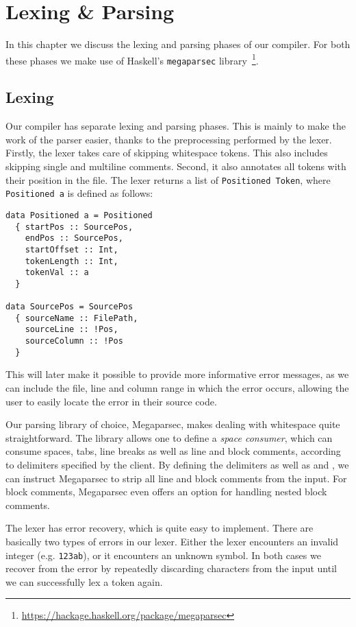 \chapter{Lexing \& Parsing}

In this chapter we discuss the lexing and parsing phases of our compiler.
For both these phases we make use of Haskell's \texttt{megaparsec}
library~\footnote{\url{https://hackage.haskell.org/package/megaparsec}}.

\section{Lexing}
Our compiler has separate lexing and parsing phases.
This is mainly to make the work of the parser easier, thanks to the preprocessing
performed by the lexer.
Firstly, the lexer takes care of skipping whitespace tokens.
This also includes skipping single and multiline comments.
Second, it also annotates all tokens with their position in the file.
The lexer returns a list of \texttt{Positioned Token},
where \texttt{Positioned a} is defined as follows:
\begin{verbatim}
data Positioned a = Positioned
  { startPos :: SourcePos,
    endPos :: SourcePos,
    startOffset :: Int,
    tokenLength :: Int,
    tokenVal :: a
  }

data SourcePos = SourcePos
  { sourceName :: FilePath,
    sourceLine :: !Pos,
    sourceColumn :: !Pos
  }
\end{verbatim}
This will later make it possible to provide more informative error messages, as
we can include the file, line and column range in which the error occurs,
allowing the user to easily locate the error in their source code.

Our parsing library of choice, Megaparsec, makes dealing with whitespace quite
straightforward. The library allows one to define a \emph{space consumer}, which
can consume spaces, tabs, line breaks as well as line and block comments,
according to delimiters specified by the client.
By defining the delimiters \code{//} as well as \code{/*} and \code{*/}, we can
instruct Megaparsec to strip all line and block comments from the input.
For block comments, Megaparsec even offers an option for handling nested block
comments.

The lexer has error recovery, which is quite easy to implement.
There are basically two types of errors in our lexer.
Either the lexer encounters an invalid integer (e.g. \verb|123ab|),
or it encounters an unknown symbol.
In both cases we recover from the error by repeatedly discarding characters from
the input until we can successfully lex a token again.


